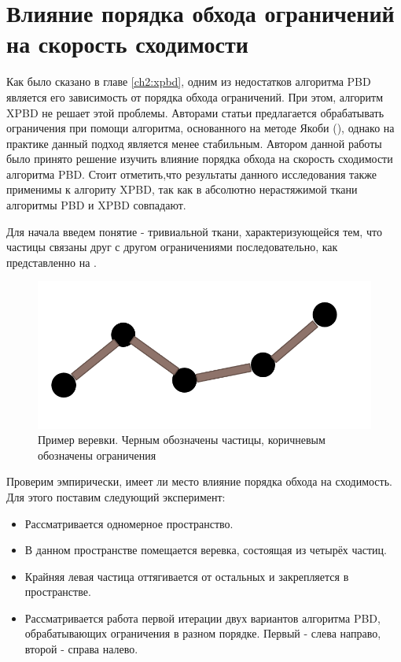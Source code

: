 \section{Влияние порядка обхода ограничений на скорость сходимости} \label{ch3:order}
	Как было сказано в главе \ref{ch2:xpbd}, одним из недостатков алгоритма PBD является его зависимость от порядка обхода ограничений. При этом, алгоритм XPBD не решает этой проблемы. Авторами статьи \cite{muller2020detailed} предлагается обрабатывать ограничения при помощи алгоритма, основанного на методе Якоби (), однако на практике данный подход является менее стабильным. Автором данной работы было принято решение изучить влияние порядка обхода на скорость сходимости алгоритма PBD. Стоит отметить,что результаты данного исследования также применимы к алгориту XPBD, так как в абсолютно нерастяжимой ткани алгоритмы PBD и XPBD совпадают.
	
	Для начала введем понятие  - тривиальной ткани, характеризующейся тем, что частицы связаны друг с другом ограничениями  последовательно, как представленно на .
	
	\begin{figure}[ht!] 
		\center
		\includegraphics [scale=0.55] {my_folder/images//rope}
		\caption{Пример веревки. Черным обозначены частицы, коричневым обозначены ограничения}
		\label{fig:rope}  
	\end{figure}
	
	Проверим эмпирически, имеет ли место влияние порядка обхода на сходимость. Для этого поставим следующий эксперимент:
	\begin{itemize}
		\item Рассматривается одномерное пространство.
		\item В данном пространстве помещается веревка, состоящая из четырёх частиц.
		\item Крайняя левая частица оттягивается от остальных и закрепляется в пространстве.
		\item Рассматривается работа первой итерации двух вариантов алгоритма PBD, обрабатывающих ограничения в разном порядке. Первый - слева направо, второй - справа налево.
	\end{itemize}
	
